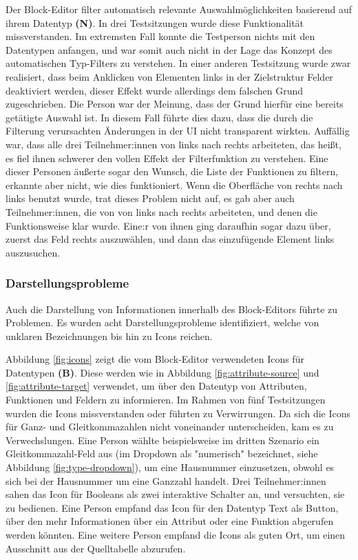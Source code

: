 Der Block-Editor filter automatisch relevante Auswahlmöglichkeiten basierend auf ihrem Datentyp \textbf{(N)}. In drei Testsitzungen wurde diese Funktionalität missverstanden. Im extremsten Fall konnte die Testperson nichts mit den Datentypen anfangen, und war somit auch nicht in der Lage das Konzept des automatischen Typ-Filters zu verstehen. In einer anderen Testsitzung wurde zwar realisiert, dass beim Anklicken von Elementen links in der Zielstruktur Felder deaktiviert werden, dieser Effekt wurde allerdings dem falschen Grund zugeschrieben. Die Person war der Meinung, dass der Grund hierfür eine bereits getätigte Auswahl ist. In diesem Fall führte dies dazu, dass die durch die Filterung verursachten Änderungen in der UI nicht transparent wirkten. Auffällig war, dass alle drei Teilnehmer:innen von links nach rechts arbeiteten, das heißt, es fiel ihnen schwerer den vollen Effekt der Filterfunktion zu verstehen. Eine dieser Personen äußerte sogar den Wunsch, die Liste der Funktionen zu filtern, erkannte aber nicht, wie dies funktioniert. Wenn die Oberfläche von rechts nach links benutzt wurde, trat dieses Problem nicht auf, es gab aber auch Teilnehmer:innen, die von von links nach rechts arbeiteten, und denen die Funktionsweise klar wurde. Eine:r von ihnen ging daraufhin sogar dazu über, zuerst das Feld rechts auszuwählen, und dann das einzufügende Element links auszusuchen.

\subsubsection{Darstellungsprobleme}

Auch die Darstellung von Informationen innerhalb des Block-Editors führte zu Problemen. Es wurden acht Darstellungsprobleme identifiziert, welche von unklaren Bezeichnungen bis hin zu Icons reichen.

Abbildung \ref{fig:icons} zeigt die vom Block-Editor verwendeten Icons für Datentypen \textbf{(B)}. Diese werden wie in Abbildung \ref{fig:attribute-source} und \ref{fig:attribute-target} verwendet, um über den Datentyp von Attributen, Funktionen und Feldern zu informieren. Im Rahmen von fünf Testsitzungen wurden die Icons missverstanden oder führten zu Verwirrungen. Da sich die Icons für Ganz- und Gleitkommazahlen nicht voneinander unterscheiden, kam es zu Verwechslungen. Eine Person wählte beispielsweise im dritten Szenario ein Gleitkommazahl-Feld aus (im Dropdown als "numerisch" bezeichnet, siehe Abbildung \ref{fig:type-dropdown}), um eine Hausnummer einzusetzen, obwohl es sich bei der Hausnummer um eine Ganzzahl handelt.  Drei Teilnehmer:innen sahen das Icon für Booleans als zwei interaktive Schalter an, und versuchten, sie zu bedienen. Eine Person empfand das Icon für den Datentyp Text als Button, über den mehr Informationen über ein Attribut oder eine Funktion abgerufen werden könnten. Eine weitere Person empfand die Icons als guten Ort, um einen Ausschnitt aus der Quelltabelle abzurufen.

